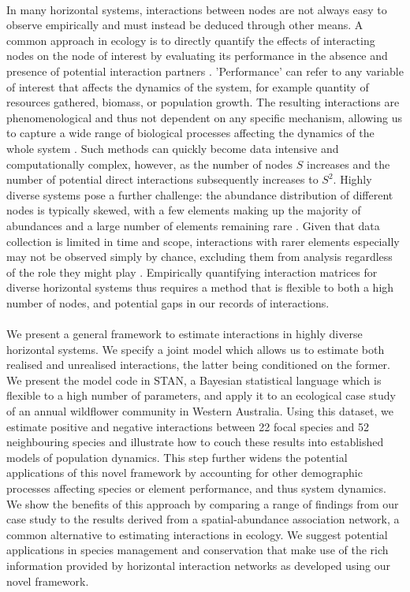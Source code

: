 \documentclass[a4,12pt]{article}
\begin{document}
    \paragraph{} 
    In many horizontal systems, interactions between nodes are not always easy to observe empirically and must instead be deduced through other means. A common approach in ecology is to directly quantify the effects of interacting nodes on the node of interest by evaluating its performance in the absence and presence of potential interaction partners \parencite{Connell1961, Grace1990}. 'Performance' can refer to any variable of interest that affects the dynamics of the system, for example quantity of resources gathered, biomass, or population growth. The resulting interactions are phenomenological and thus not dependent on any specific mechanism, allowing us to capture a wide range of biological processes affecting the dynamics of the whole system \parencite{Novak2010}. Such methods can quickly become data intensive and computationally complex, however, as the number of nodes $S$ increases and the number of potential direct interactions subsequently increases to $S^2$. Highly diverse systems pose a further challenge: the abundance distribution of different nodes is typically skewed, with a few elements making up the majority of abundances and a large number of elements remaining rare \parencite{Fisher1943}. Given that data collection is limited in time and scope, interactions with rarer elements especially may not be observed simply by chance, excluding them from analysis regardless of the role they might play \parencite{Olesen2011}. Empirically quantifying interaction matrices for diverse horizontal systems thus requires a method that is flexible to both a high number of nodes, and potential gaps in our records of interactions. 


    \paragraph{} 
    We present a general framework to estimate interactions in highly diverse horizontal systems. We specify a joint model which allows us to estimate both realised and unrealised interactions, the latter being conditioned on the former. We present the model code in STAN, a Bayesian statistical language which is flexible to a high number of parameters, and apply it to an ecological case study of an annual wildflower community in Western Australia. Using this  dataset, we estimate positive and negative interactions between 22 focal species and 52 neighbouring species and illustrate how to couch these results into established models of population dynamics. This step further widens the potential applications of this novel framework by accounting for other demographic processes affecting species or element performance, and thus system dynamics. We show the benefits of this approach by comparing a range of findings from our case study to the results derived from a spatial-abundance association network, a common alternative to estimating interactions in ecology. We suggest potential applications in species management and conservation that make use of the rich information provided by horizontal interaction networks as developed using our novel framework.
\end{document}
